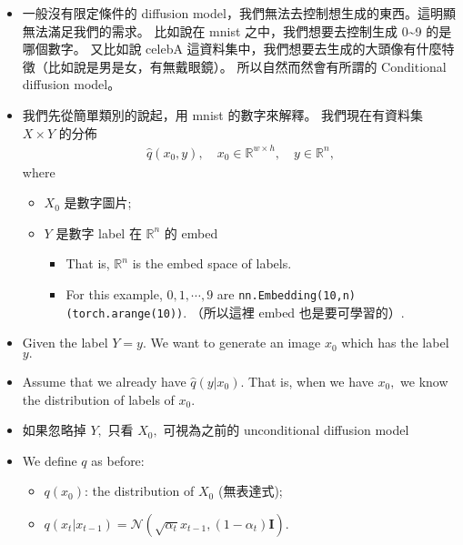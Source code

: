\documentclass[
]{article}
\providecommand{\tightlist}{%
  \setlength{\itemsep}{0pt}\setlength{\parskip}{0pt}}\usepackage{longtable,booktabs,array}
\theoremstyle{remark}
\begin{document}
\begin{itemize}
\item
  一般沒有限定條件的 diffusion
  model，我們無法去控制想生成的東西。這明顯無法滿足我們的需求。 比如說在
  mnist 之中，我們想要去控制生成 0\textasciitilde9 的是哪個數字。
  又比如說 celebA
  這資料集中，我們想要去生成的大頭像有什麼特徵（比如說是男是女，有無戴眼鏡）。
  所以自然而然會有所謂的 Conditional diffusion model。
\item
  我們先從簡單類別的說起，用 mnist 的數字來解釋。 我們現在有資料集
  \(X \times Y\) 的分佈 \[
  \begin{aligned}
    \widehat{q}(x_0,y), \quad x_0 \in \mathbb R^{w\times h}, \quad y\in \mathbb R^n,
  \end{aligned}
  \] where

  \begin{itemize}
  \tightlist
  \item
    \(X_0\) 是數字圖片;
  \item
    \(Y\) 是數字 label 在 \(\mathbb R^n\) 的 embed

    \begin{itemize}
    \tightlist
    \item
      That is, \(\mathbb R^n\) is the embed space of labels.
    \item
      For this example, \(0,1,\cdots, 9\) are
      \texttt{nn.Embedding(10,n)(torch.arange(10))}. （所以這裡 embed
      也是要可學習的）.
    \end{itemize}
  \end{itemize}
\item
  Given the label \(Y = y.\) We want to generate an image \(x_0\) which
  has the label \(y.\)
\item
  Assume that we already have \(\widehat{q}(y\vert x_0).\) That is, when
  we have \(x_0,\) we know the distribution of labels of \(x_0.\)
\item
  如果忽略掉 \(Y,\) 只看 \(X_0,\) 可視為之前的 unconditional diffusion
  model
\item
  We define \(q\) as before:

  \begin{itemize}
  \tightlist
  \item
    \(q(x_0)\): the distribution of \(X_0\) (無表達式);
  \item
    \(q(x_t\vert x_{t-1})= \mathcal{N}(\sqrt{\alpha_t}x_{t-1}, (1-\alpha_t)\mathbf{I}).\)
  \end{itemize}
\end{itemize}
\end{document}
